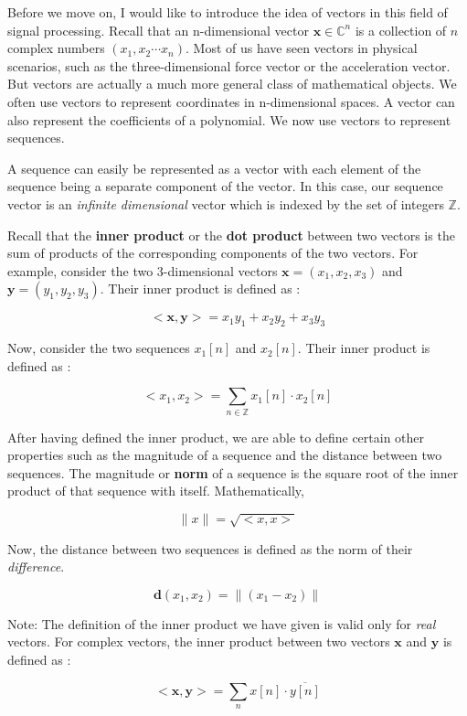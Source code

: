 \documentclass{article}
\theoremstyle{definition}
\begin{document}
Before we move on, I would like to introduce the idea of vectors in this field of signal processing. Recall that an n-dimensional vector $\textbf{x} \in \mathbb{C}^n$ is a collection of $n$ complex numbers $(x_1 , x_2 \cdots	x_n)$. Most of us have seen vectors in physical scenarios, such as the three-dimensional force vector or the acceleration vector. But vectors are actually a much more general class of mathematical objects. We often use vectors to represent coordinates in n-dimensional spaces. A vector can also represent the coefficients of a polynomial. We now use vectors to represent sequences. \smallskip

A sequence can easily be represented as a vector with each element of the sequence being a separate component of the vector. In this case, our sequence vector is an \textit{infinite dimensional} vector which is indexed by the set of integers $\mathbb{Z}$. \smallskip

Recall that the \textbf{inner product} or the \textbf{dot product} between two vectors is the sum of products of the corresponding components of the two vectors. For example, consider the two 3-dimensional vectors $\textbf{x} = (x_1,x_2,x_3)$ and $\textbf{y} = (y_1,y_2,y_3)$. Their inner product is defined as :

\[
	< \textbf{x} , \textbf{y} > = x_1y_1 + x_2y_2 + x_3y_3
\] 

Now, consider the two sequences $x_1[n]$ and $x_2[n]$. Their inner product is defined as :

\[
	< x_1 , x_2 > = \sum_{n \in \mathbb{Z}} x_1[n]\cdot  x_2[n]
\] 

After having defined the inner product, we are able to define certain other properties such as the magnitude of a sequence and the distance between two sequences. The magnitude or \textbf{norm} of a sequence is the square root of the inner product of that sequence with itself. Mathematically, 

\[
	\| x \| = \sqrt{<x,x>}
\]

Now, the distance between two sequences is defined as the norm of their \textit{difference}. 

\[
	\textbf{d}(x_1,x_2) = \| (x_1 - x_2) \|
\]

Note: The definition of the inner product we have given is valid only for \textit{real} vectors. For complex vectors, the inner product between two vectors $\textbf{x}$ and $\textbf{y}$ is defined as : 

\[
	< \textbf{x} , \textbf{y} > = \sum_{n} x[n] \cdot \overline{y[n]}
\]
\end{document}
